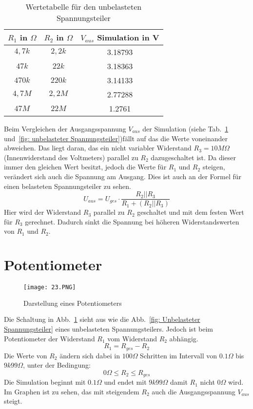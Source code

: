 \begin{table}[h!]
\centering
\caption{Wertetabelle für den unbelasteten Spannungsteiler }
\label{fig: belasteter Spannungsteiler}
\begin{tabular}{|c|c|c|} \hline
$R_1$ in $\Omega$ & $R_2$ in $\Omega$ & $V_{aus}$ Simulation in V \\ \hline
$4,7k$ & $2,2k$ & 3.18793\\ \hline
$47k$ & $22k$ & 3.18363\\ \hline
$470k$ & $220k$ & 3.14133\\ \hline
$4,7M$ & $2,2M$ & 2.77288\\ \hline
$47M$ & $22M$ & 1.2761\\ \hline

\end{tabular}
\end{table}

Beim Vergleichen der Ausgangsspannung $V_{aus}$ der Simulation (siehe Tab.~\ref{fig: belasteter Spannungsteiler} und~\ref{fig: unbelasteter Spannungsteiler})fällt auf das die Werte voneinander abweichen. Das liegt daran, das ein nicht variabler Widerstand $R_3=10M\Omega$ (Innenwiderstand des Voltmeters) parallel zu $R_2$ dazugeschaltet ist. Da dieser immer den gleichen Wert besitzt, jedoch die Werte für $R_1$ und $R_2$ steigen, verändert sich auch die Spannung am Ausgang. Dies  ist auch an der Formel für einen belasteten Spannungsteiler zu sehen.
\begin{equation}
U_{aus}=U_{ges}\cdot \frac{R_2||R_3}{R_1+(R_2||R_3)}
\end{equation}
Hier wird der Widerstand $R_3$ parallel zu $R_2$ geschaltet und  mit dem festen Wert für $R_3$ gerechnet. Dadurch sinkt die Spannung bei höheren Widerstandswerten von $R_1$ und $R_2$.

\section{Potentiometer}
\begin{figure}[h!]
\centering
\texttt{[image: 23.PNG]}
\caption{Darstellung eines Potentiometers}
\label{fig: Potentiometer}
\end{figure}

Die Schaltung in Abb.~\ref{fig: Potentiometer} sieht aus wie die Abb.~\ref{fig: Unbelasteter Spannungsteiler} eines unbelasteten Spannungsteilers. Jedoch ist beim Potentiometer der Widerstand $R_1$ vom Widerstand $R_2$ abhängig.
\begin{equation}
R_1=R_{ges}-R_2
\end{equation}
Die Werte von $R_2$ ändern sich dabei in $100\Omega$ Schritten im Intervall von $0.1\Omega$ bis $9k99\Omega$, unter der Bedingung:
$$0\Omega \leq R_2\leq R_{ges}$$
Die Simulation beginnt mit $0.1\Omega$ und endet mit $9k99\Omega$ damit $R_1$ nicht $0\Omega$ wird.\\
Im Graphen  ist zu sehen, das mit steigendem $R_2$ auch die Ausgangsspannung $V_{aus}$ steigt.







